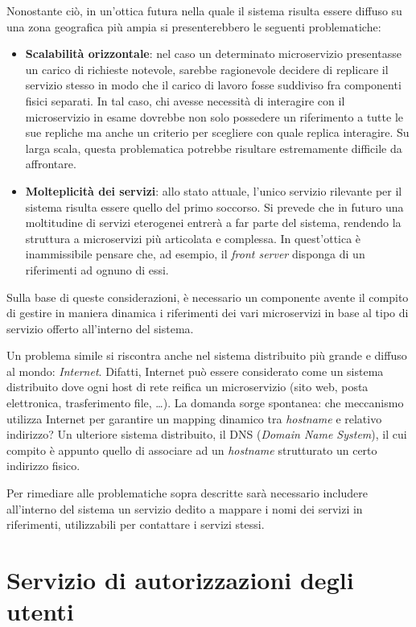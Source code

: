 \documentclass[a4paper,12pt]{report}
\begin{document}
Nonostante ciò, in un'ottica futura nella quale il sistema risulta essere diffuso su una zona geografica più ampia si presenterebbero le seguenti problematiche:
\begin{itemize}
	\item \textbf{Scalabilità orizzontale}: nel caso un determinato microservizio presentasse un carico di richieste notevole, sarebbe ragionevole decidere di replicare il servizio stesso in modo che il carico di lavoro fosse suddiviso fra componenti fisici separati. In tal caso, chi avesse necessità di interagire con il microservizio in esame dovrebbe non solo possedere un riferimento a tutte le sue repliche ma anche un criterio per scegliere con quale replica interagire. Su larga scala, questa problematica potrebbe risultare estremamente difficile da affrontare.
	\item \textbf{Molteplicità dei servizi}: allo stato attuale, l'unico servizio rilevante per il sistema risulta essere quello del primo soccorso. Si prevede che in futuro una moltitudine di servizi eterogenei entrerà a far parte del sistema, rendendo la struttura a microservizi più articolata e complessa. In quest'ottica è inammissibile pensare che, ad esempio, il \emph{front server} disponga di un riferimenti ad ognuno di essi. 
\end{itemize}

Sulla base di queste considerazioni, è necessario un componente avente il compito di gestire in maniera dinamica i riferimenti dei vari microservizi in base al tipo di servizio offerto all'interno del sistema. 

Un problema simile si riscontra anche nel sistema distribuito più grande e diffuso al mondo: \emph{Internet}. Difatti, Internet può essere considerato come un sistema distribuito dove ogni host di rete reifica un microservizio (sito web, posta elettronica, trasferimento file, \dots). La domanda sorge spontanea: che meccanismo utilizza Internet per garantire un mapping dinamico tra \emph{hostname} e relativo indirizzo? Un ulteriore sistema distribuito, il DNS (\emph{Domain Name System}), il cui compito è appunto quello di associare ad un \emph{hostname} strutturato un certo indirizzo fisico.

Per rimediare alle problematiche sopra descritte sarà necessario includere all'interno del sistema un servizio dedito a mappare i nomi dei servizi in riferimenti, utilizzabili per contattare i servizi stessi.

\section{Servizio di autorizzazioni degli utenti}
\end{document}
